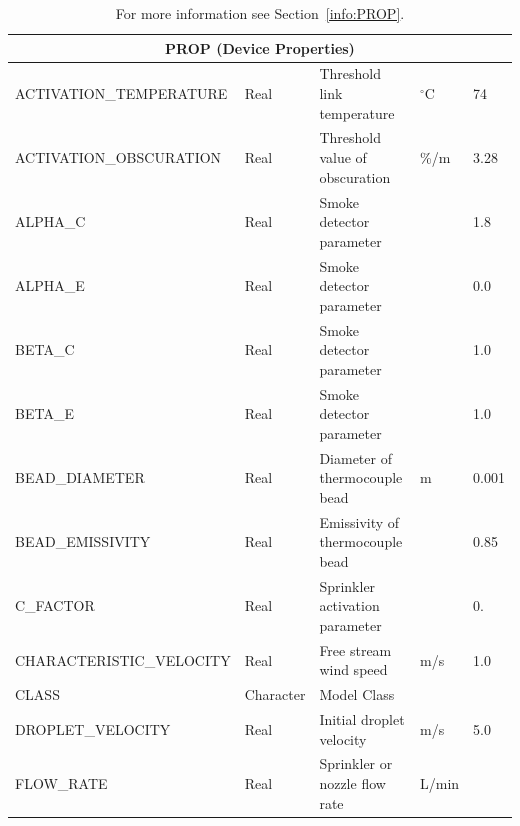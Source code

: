 \documentclass[11pt]{book}
\begin{document}
\begin{table}[H]
\caption{For more information see Section~\ref{info:PROP}.}\label{tbl:PROP}
\noindent
\begin{tabular*}{\textwidth}{@{\extracolsep{\fill}}|l|l|l|l|l|}
\hline
\multicolumn{5}{|c|}{{\ct PROP} (Device Properties)} \\ \hline \hline
{\ct ACTIVATION\_TEMPERATURE}           & Real          & Threshold link temperature       & $^\circ$C             & 74        \\ \hline
{\ct ACTIVATION\_OBSCURATION}           & Real          & Threshold value of obscuration   & \%/m                  & 3.28      \\ \hline
{\ct ALPHA\_C}                          & Real          & Smoke detector parameter         &                       & 1.8       \\ \hline
{\ct ALPHA\_E}                          & Real          & Smoke detector parameter         &                       & 0.0       \\ \hline
{\ct BETA\_C}                           & Real          & Smoke detector parameter         &                       & 1.0       \\ \hline
{\ct BETA\_E}                           & Real          & Smoke detector parameter         &                       & 1.0       \\ \hline
{\ct BEAD\_DIAMETER}                    & Real          & Diameter of thermocouple bead    & m                     & 0.001     \\ \hline
{\ct BEAD\_EMISSIVITY}                  & Real          & Emissivity of thermocouple bead  &                       & 0.85      \\ \hline
{\ct C\_FACTOR}                         & Real          & Sprinkler activation parameter   &                       & 0.        \\ \hline
{\ct CHARACTERISTIC\_VELOCITY}          & Real          & Free stream wind speed           & m/s                   & 1.0       \\ \hline
{\ct CLASS}                             & Character     & Model Class                      &                       &           \\ \hline
{\ct DROPLET\_VELOCITY}                 & Real          & Initial droplet velocity         & m/s                   & 5.0       \\ \hline
{\ct FLOW\_RATE}                        & Real          & Sprinkler or nozzle flow rate    & L/min                 &           \\ \hline

\end{tabular*}
\end{table}
\end{document}
